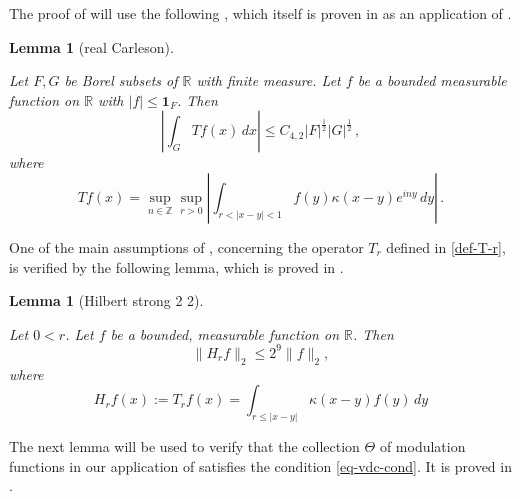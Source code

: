 \documentclass[10pt,a4paper]{article}
\theoremstyle{plain}
\newtheorem{lemma}[theorem]{Lemma}
\theoremstyle{definition}
\numberwithin{equation}{subsection}
\newcommand{\R}{{\mathbb{R}}}
\newcommand{\Mf}{{\Theta}}
\newcommand{\lean}[1]{}
\newcommand{\uses}[1]{}
\newcommand{\leanok}{}
\begin{document}
The proof of  will
use the following , which itself is proven
 in  as an application of
 .
\begin{lemma}[real Carleson]\label{real-Carleson}
\uses{two-sided-metric-space-Carleson,real-line-doubling,real-line-metric,real-line-measure,oscillation-control,frequency-monotone,frequency-ball-doubling,frequency-ball-growth,integer-ball-cover,real-van-der-Corput,Hilbert-strong-2-2,Hilbert-kernel-regularity,Hilbert-kernel-bound}
\leanok
\lean{rcarleson}
    Let $F,G$ be Borel subsets of $\R$ with finite measure. Let $f$ be a bounded measurable function on $\R$ with $|f|\le \mathbf{1}_F$. Then
\begin{equation}
    \left|\int _G Tf(x) \, dx\right| \le C_{4,2} |F|^{\frac 12} |G|^{\frac 12} \, ,
\end{equation}
where
\begin{equation}
    \label{define-T-carleson}
    T f(x)=\sup_{n\in \mathbb{Z}}
    \sup_{r>0}\left|\int_{r<|x-y|<1} f(y)\kappa(x-y) e^{iny}\, dy\right|\, .
\end{equation}
\end{lemma}


One of the main assumptions of , concerning the operator $T_r$ defined in \eqref{def-T-r}, is verified by the following lemma, which is proved in .
\begin{lemma}[Hilbert strong 2 2]
    \label{Hilbert-strong-2-2}
    \uses{modulated-averaged-projection,integrable-bump-convolution,Dirichlet-approximation}
    \leanok
    \lean{Hilbert_strong_2_2}
    Let $0<r$. Let $f$ be a bounded, measurable function on $\mathbb{R}$. Then
    \begin{equation}
        \label{eq-Hr-L2-bound}
        \|H_rf\|_{2}\leq 2^{9} \|f\|_2,
    \end{equation}
    where
    \begin{equation}
        \label{def-H-r}
        H_r f(x) := T_r f(x) = \int_{r\le |x-y|} \kappa(x-y) f(y) \, dy
    \end{equation}
\end{lemma}

The next lemma will be used to verify that the collection $\Mf$ of modulation functions in our application of  satisfies the condition \eqref{eq-vdc-cond}.
It is proved in .
\end{document}
